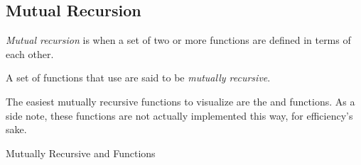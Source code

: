 \subsection{Mutual Recursion}\label{subsec:Mutual_Recursion}
\begin{definition}\label{def:Mutual_Recursion}
  \emph{Mutual recursion} is when a set of two or more functions are defined in terms of each other.

  \begin{remark}\label{rmk:Mutually_Recursive}
    A set of functions that use  are said to be \emph{mutually recursive}.
  \end{remark}
\end{definition}

The easiest mutually recursive functions to visualize are the  and  functions.
As a side note, these functions are not actually implemented this way, for efficiency's sake.
\begin{listing}[h!tbp]
\caption{Mutually Recursive  and  Functions}
\label{lst:Mutually_Recursive-Even_Odd}
\end{listing}

